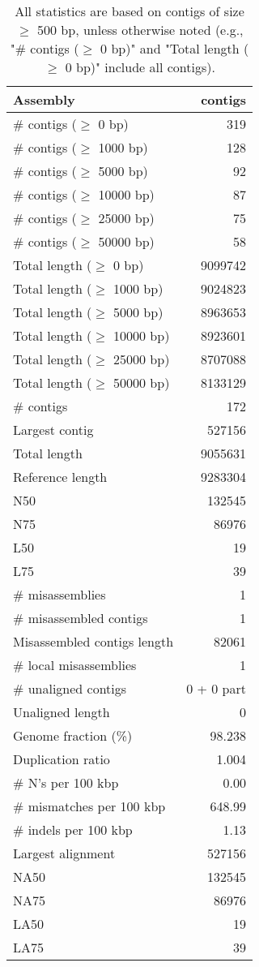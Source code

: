 \documentclass[12pt,a4paper]{article}
\begin{document}
\begin{table}[ht]
\begin{center}
\caption{All statistics are based on contigs of size $\geq$ 500 bp, unless otherwise noted (e.g., "\# contigs ($\geq$ 0 bp)" and "Total length ($\geq$ 0 bp)" include all contigs).}
\begin{tabular}{|l*{1}{|r}|}
\hline
Assembly & contigs \\ \hline
\# contigs ($\geq$ 0 bp) & 319 \\ \hline
\# contigs ($\geq$ 1000 bp) & 128 \\ \hline
\# contigs ($\geq$ 5000 bp) & 92 \\ \hline
\# contigs ($\geq$ 10000 bp) & 87 \\ \hline
\# contigs ($\geq$ 25000 bp) & 75 \\ \hline
\# contigs ($\geq$ 50000 bp) & 58 \\ \hline
Total length ($\geq$ 0 bp) & 9099742 \\ \hline
Total length ($\geq$ 1000 bp) & 9024823 \\ \hline
Total length ($\geq$ 5000 bp) & 8963653 \\ \hline
Total length ($\geq$ 10000 bp) & 8923601 \\ \hline
Total length ($\geq$ 25000 bp) & 8707088 \\ \hline
Total length ($\geq$ 50000 bp) & 8133129 \\ \hline
\# contigs & 172 \\ \hline
Largest contig & 527156 \\ \hline
Total length & 9055631 \\ \hline
Reference length & 9283304 \\ \hline
N50 & 132545 \\ \hline
N75 & 86976 \\ \hline
L50 & 19 \\ \hline
L75 & 39 \\ \hline
\# misassemblies & 1 \\ \hline
\# misassembled contigs & 1 \\ \hline
Misassembled contigs length & 82061 \\ \hline
\# local misassemblies & 1 \\ \hline
\# unaligned contigs & 0 + 0 part \\ \hline
Unaligned length & 0 \\ \hline
Genome fraction (\%) & 98.238 \\ \hline
Duplication ratio & 1.004 \\ \hline
\# N's per 100 kbp & 0.00 \\ \hline
\# mismatches per 100 kbp & 648.99 \\ \hline
\# indels per 100 kbp & 1.13 \\ \hline
Largest alignment & 527156 \\ \hline
NA50 & 132545 \\ \hline
NA75 & 86976 \\ \hline
LA50 & 19 \\ \hline
LA75 & 39 \\ \hline
\end{tabular}
\end{center}
\end{table}
\end{document}
